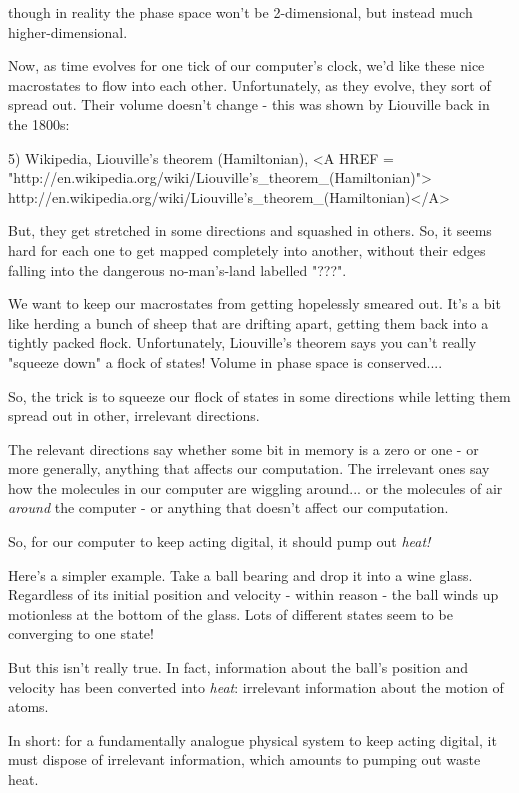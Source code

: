 though in reality the phase space won't be 2-dimensional, but 
instead much higher-dimensional.

Now, as time evolves for one tick of our computer's clock, we'd 
like these nice macrostates to flow into each other.  Unfortunately, 
as they evolve, they sort of spread out.  Their volume doesn't change - 
this was shown by Liouville back in the 1800s:

5) Wikipedia, Liouville's theorem (Hamiltonian),
<A HREF = "http://en.wikipedia.org/wiki/Liouville's_theorem_(Hamiltonian)">
http://en.wikipedia.org/wiki/Liouville's_theorem_(Hamiltonian)</A>

But, they get stretched in some directions and squashed in others.  
So, it seems hard for each one to get mapped completely into another, 
without their edges falling into the dangerous no-man's-land 
labelled "???".

We want to keep our macrostates from getting hopelessly smeared 
out.  It's a bit like herding a bunch of sheep that are drifting 
apart, getting them back into a tightly packed flock.  Unfortunately, 
Liouville's theorem says you can't really "squeeze down" a flock of 
states!  Volume in phase space is conserved....

So, the trick is to squeeze our flock of states in some directions 
while letting them spread out in other, irrelevant directions.   

The relevant directions say whether some bit in memory is a zero or 
one - or more generally, anything that affects our computation.  The 
irrelevant ones say how the molecules in our computer are wiggling 
around... or the molecules of air \emph{around} the computer - or anything
that doesn't affect our computation.

So, for our computer to keep acting digital, it should pump out 
\emph{heat!}  

Here's a simpler example.  Take a ball bearing and drop it into
a wine glass.  Regardless of its initial position and velocity - 
within reason - the ball winds up motionless at the bottom of 
the glass.  Lots of different states seem to be converging to 
one state!  

But this isn't really true.  In fact, information about the ball's 
position and velocity has been converted into \emph{heat}: irrelevant 
information about the motion of atoms.

In short: for a fundamentally analogue physical system to keep 
acting digital, it must dispose of irrelevant information, which 
amounts to pumping out waste heat.  


